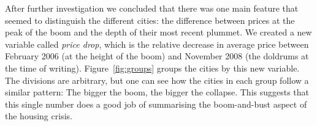 \documentclass[oneside]{article}
\begin{document}
% 
% 

After further investigation we concluded that there was one main feature that seemed to distinguish the different cities: the difference between prices at the peak of the boom and the depth of their most recent plummet.  We created a new variable called {\em price drop}, which is the relative decrease in average price between February 2006 (at the height of the boom) and November 2008 (the doldrums at the time of writing). Figure~\ref{fig:groups} groups the cities by this new variable.  The divisions are arbitrary, but one can see how the cities in each group follow a similar pattern: The bigger the boom, the bigger the collapse.  This suggests that this single number does a good job of summarising the boom-and-bust aspect of the housing crisis.
\end{document}
